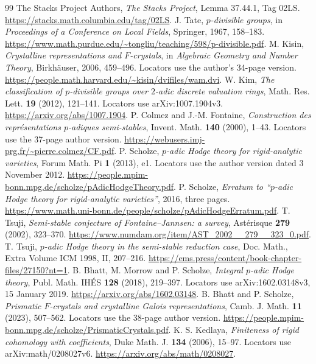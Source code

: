 \documentclass[11pt]{article}
\theoremstyle{definition}\newtheorem{definition}[theorem]{Definition}
\theoremstyle{remark}\newtheorem{remark}[theorem]{Remark}
\begin{document}
\begin{thebibliography}{99}
 The Stacks Project Authors, \emph{The Stacks Project}, Lemma 37.44.1, Tag 02LS. \url{https://stacks.math.columbia.edu/tag/02LS}.
 J. Tate, \emph{$p$-divisible groups}, in \emph{Proceedings of a Conference on Local Fields}, Springer, 1967, 158--183. \url{https://www.math.purdue.edu/~tongliu/teaching/598/p-divisible.pdf}.
 M. Kisin, \emph{Crystalline representations and $F$-crystals}, in \emph{Algebraic Geometry and Number Theory}, Birkh\"auser, 2006, 459--496. Locators use the author's 34-page version. \url{https://people.math.harvard.edu/~kisin/dvifiles/wam.dvi}.
 W. Kim, \emph{The classification of $p$-divisible groups over $2$-adic discrete valuation rings}, Math. Res. Lett. \textbf{19} (2012), 121--141. Locators use arXiv:1007.1904v3. \url{https://arxiv.org/abs/1007.1904}.
 P. Colmez and J.-M. Fontaine, \emph{Construction des repr\'esentations $p$-adiques semi-stables}, Invent. Math. \textbf{140} (2000), 1--43. Locators use the 37-page author version. \url{https://webusers.imj-prg.fr/~pierre.colmez/CF.pdf}.
 P. Scholze, \emph{$p$-adic Hodge theory for rigid-analytic varieties}, Forum Math. Pi \textbf{1} (2013), e1. Locators use the author version dated 3 November 2012. \url{https://people.mpim-bonn.mpg.de/scholze/pAdicHodgeTheory.pdf}.
 P. Scholze, \emph{Erratum to ``$p$-adic Hodge theory for rigid-analytic varieties''}, 2016, three pages. \url{https://www.math.uni-bonn.de/people/scholze/pAdicHodgeErratum.pdf}.
 T. Tsuji, \emph{Semi-stable conjecture of Fontaine--Jannsen: a survey}, Ast\'erisque \textbf{279} (2002), 323--370. \url{https://www.numdam.org/item/AST_2002__279__323_0.pdf}.
 T. Tsuji, \emph{$p$-adic Hodge theory in the semi-stable reduction case}, Doc. Math., Extra Volume ICM 1998, II, 207--216. \url{https://ems.press/content/book-chapter-files/27150?nt=1}.
 B. Bhatt, M. Morrow and P. Scholze, \emph{Integral $p$-adic Hodge theory}, Publ. Math. IH\'ES \textbf{128} (2018), 219--397. Locators use arXiv:1602.03148v3, 15 January 2019. \url{https://arxiv.org/abs/1602.03148}.
 B. Bhatt and P. Scholze, \emph{Prismatic $F$-crystals and crystalline Galois representations}, Camb. J. Math. \textbf{11} (2023), 507--562. Locators use the 38-page author version. \url{https://people.mpim-bonn.mpg.de/scholze/PrismaticCrystals.pdf}.
 K. S. Kedlaya, \emph{Finiteness of rigid cohomology with coefficients}, Duke Math. J. \textbf{134} (2006), 15--97. Locators use arXiv:math/0208027v6. \url{https://arxiv.org/abs/math/0208027}.

\end{thebibliography}
\end{document}

